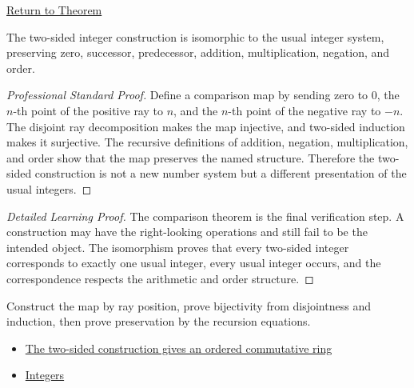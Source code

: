 \newpage
{}
\label{prf:two-sided-integers-isomorphic-to-z}

\begin{remark*}[Return]
\hyperref[thm:two-sided-integers-isomorphic-to-z]{Return to Theorem}
\end{remark*}

\begin{theorem*}
The two-sided integer construction is isomorphic to the usual integer system,
preserving zero, successor, predecessor, addition, multiplication, negation,
and order.
\end{theorem*}

\begin{proof}[Professional Standard Proof]
\LRAProofBodyStart
Define a comparison map by sending zero to \(0\), the \(n\)-th point of the
positive ray to \(n\), and the \(n\)-th point of the negative ray to \(-n\).
The disjoint ray decomposition makes the map injective, and two-sided
induction makes it surjective. The recursive definitions of addition,
negation, multiplication, and order show that the map preserves the named
structure. Therefore the two-sided construction is not a new number system but
a different presentation of the usual integers.
\end{proof}

\begin{proof}[Detailed Learning Proof]
\LRAProofBodyStart
The comparison theorem is the final verification step. A construction may have
the right-looking operations and still fail to be the intended object. The
isomorphism proves that every two-sided integer corresponds to exactly one
usual integer, every usual integer occurs, and the correspondence respects the
arithmetic and order structure.
\end{proof}

\begin{remark*}
Construct the map by ray position, prove bijectivity from disjointness and
induction, then prove preservation by the recursion equations.
\end{remark*}

\begin{dependencies}
\begin{itemize}
  \item \hyperref[thm:two-sided-integers-ordered-commutative-ring]{The two-sided construction gives an ordered commutative ring}
  \item \hyperref[def:integers]{Integers}
\end{itemize}
\end{dependencies}

\clearpage
